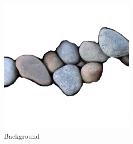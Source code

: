 \begin{figure}[]
\begin{subfigure}{\textwidth}
\begin{subfigure}{0.24\textwidth}
            \includegraphics[width=\textwidth]{images/04-experiment01/pebbles/some_bg.jpg}
            \caption{Background}
            \vspace*{5mm}
            \label{fig:ex01-pebbles-1000steps-some_bg}
        \end{subfigure}
        \hfill
        \begin{subfigure}{0.24\textwidth}
            \centering
\end{subfigure}
\end{subfigure}
\end{figure}
